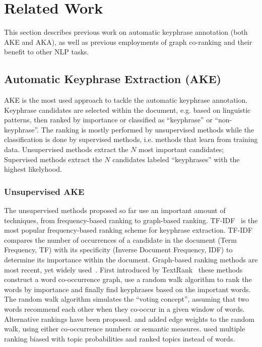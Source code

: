 \section{Related Work}
\label{sec:related_work}
  This section describes previous work on automatic keyphrase annotation (both
  AKE and AKA), as well as previous employments of graph co-ranking and their
  benefit to other NLP tasks.

  \subsection{Automatic Keyphrase Extraction (AKE)}
  \label{subsec:ake}
    AKE is the most used approach to tackle the automatic keyphrase annotation.
    Keyphrase candidates are selected within the document, e.g. based on
    linguistic patterns, then ranked by importance or classified as
    ``keyphrase'' or ``non-keyphrase''. The ranking is mostly performed by
    unsupervised methods while the classification is done by supervised methods,
    i.e. methods that learn from training data. Unsupervised methods extract the
    $N$ most important candidates; Supervised methods extract the $N$ candidates
    labeled ``keyphrases'' with the highest likelyhood.

    \subsubsection{Unsupervised AKE}
    \label{subsubsec:unsupervised_ake}
      The unsupervised methods proposed so far use an important amount of
      techniques, from frequency-based ranking to graph-based ranking.
      TF-IDF~\cite{jones1972tfidf} is the most popular frequency-based ranking
      scheme for keyphrase extraction. TF-IDF compares the number of occurrences
      of a candidate in the document (Term Frequency, TF) with its specificity
      (Inverse Document Frequency, IDF) to determine its importance within the
      document. Graph-based ranking methods are most recent, yet widely
      used~\cite{mihalcea2004textrank,wan2008expandrank,tsatsaronis2010semanticrank,liu2010topicalpagerank,bougouin2013topicrank}.
      First introduced by TextRank~\cite{mihalcea2004textrank} these methods
      construct a word co-occurrence graph, use a random walk algorithm to rank
      the words by importance and finally find keyphrases based on the important
      words. The random walk algorithm simulates the ``voting concept'',
      assuming that two words recommend each other when they co-occur in a given
      window of words. Alternative rankings have been proposed.
       and 
      added edge weights to the random walk, using either co-occurrence numbers
      or semantic measures.  used multiple
      ranking biased with topic probabilities and
       ranked topics instead of words.

